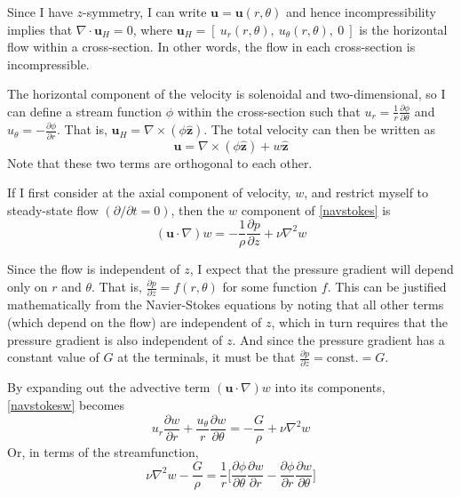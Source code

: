 \documentclass[10pt,a4paper]{report}
\begin{document}
Since I have $z$-symmetry, I can write $\bm{u} = \bm{u}(r, \theta)$ and hence incompressibility implies that $\nabla \cdot \bm{u}_H = 0$, where $\bm{u}_H = [\ u_r(r,\theta),\ u_\theta(r,\theta),\ 0\ ]$ is the horizontal flow within a cross-section. In other words, the flow in each cross-section is incompressible.

The horizontal component of the velocity is solenoidal and two-dimensional, so I can define a stream function $\phi$ within the cross-section such that $u_r = \frac{1}{r} \frac{\partial \phi}{\partial \theta}$ and $u_\theta = -\frac{\partial \phi}{\partial r}$. That is, $\bm{u}_H = \nabla \times (\phi \hat{\bm{z}})$.
The total velocity can then be written as
\begin{equation*}
\bm{u} = \nabla \times (\phi \hat{\bm{z}}) + w \hat{\bm{z}}
\end{equation*}
Note that these two terms are orthogonal to each other.

If I first consider at the axial component of velocity, $w$, and restrict myself to steady-state flow $(\partial / \partial t = 0)$, then the $w$ component of \eqref{navstokes} is
\begin{equation}\label{navstokesw}
(\bm{u} \cdot \nabla) w = -\frac{1}{\rho} \frac{\partial p}{\partial z} + \nu \nabla^2 w
\end{equation}

Since the flow is independent of $z$, I expect that the pressure gradient will depend only on $r$ and $\theta$. That is, $\frac{\partial p}{\partial z} = f(r, \theta)$ for some function $f$. This can be justified mathematically from the Navier-Stokes equations by noting that all other terms (which depend on the flow) are independent of $z$, which in turn requires that the pressure gradient is also independent of $z$. And since the pressure gradient has a constant value of $G$ at the terminals, it must be that $\frac{\partial p}{\partial z} = \textrm{const.} = G$.

By expanding out the advective term $(\bm{u} \cdot \nabla)w$ into its components, \eqref{navstokesw} becomes
\begin{equation*}
u_r \frac{\partial w}{\partial r} + \frac{u_\theta}{r} \frac{\partial w}{\partial \theta} = -\frac{G}{\rho} + \nu \nabla^2 w
\end{equation*}
Or, in terms of the streamfunction,
\begin{equation*}
\nu \nabla^2 w - \frac{G}{\rho} = \frac{1}{r} \bigg[\frac{\partial \phi}{\partial \theta} \frac{\partial w}{\partial r} - \frac{\partial \phi}{\partial r} \frac{\partial w}{\partial \theta}\bigg]
\end{equation*}
\end{document}
